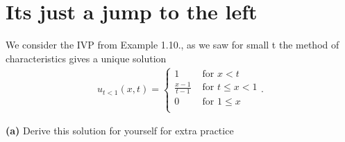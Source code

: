 \section{Its just a jump to the left}
We consider the IVP from Example 1.10., as we saw for small t the method of characteristics gives a unique solution
\begin{align*}
  u_{t<1}(x,t) = \begin{cases}
    1 &\text{ for } x<t\\
    \frac{x-1}{t-1} &\text{ for } t\le x < 1\\
    0 &\text{ for } 1\le x\\
  \end{cases}
.\end{align*}
\begin{question}
  \textbf{(a)}  Derive this solution for yourself for extra practice
\end{question}
